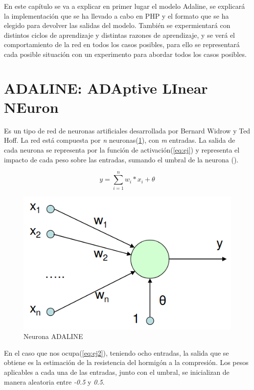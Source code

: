 \documentclass[11pt,spanish,listoffigures,listoftables]{workluis}
\begin{document}
\par En este capítulo se va a explicar en primer lugar el modelo Adaline, se explicará la implementación que se ha llevado a cabo en PHP y el formato que se ha elegido para devolver las salidas del modelo. También se expermientará con distintos ciclos de aprendizaje y distintas razones de aprendizaje, y se verá el comportamiento de la red en todos los casos posibles, para ello se representará cada posible situación con un experimento para abordar todos los casos posibles.

\section{ADALINE: ADAptive LInear NEuron}

\par Es un tipo de red de neuronas artificiales desarrollada por Bernard Widrow y Ted Hoff. La red está compuesta por \textit{n} neuronas(\ref{fig:adaline}), con \textit{m} entradas. La salida de cada neurona se representa por la función de activación(\ref{eq:ej}) y representa el impacto de cada peso sobre las entradas, sumando el umbral de la neurona (\theta).

\begin{equation}\label{eq:ej}
y = \sum_{i=1}^{n}w_{i}*x_{i} + \theta
\end{equation}

\begin{figure}
\centering
\includegraphics[scale=0.5]{adaline}
\caption{Neurona ADALINE \cite{Adaline}}\label{fig:adaline}
\end{figure}

\par En el caso que nos ocupa(\ref{eq:ej2}), teniendo ocho entradas, la salida que se obtiene es la estimación de la resistencia del hormigón a la compresión. Los pesos aplicables a cada una de las entradas, junto con el umbral, se inicializan de manera aleatoria entre \textit{-0.5} y \textit{0.5}.
\end{document}
